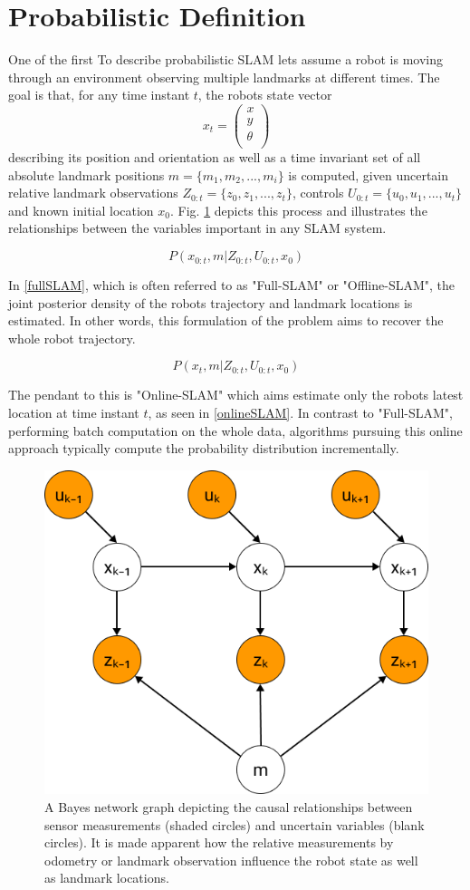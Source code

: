 \section{Probabilistic Definition}
One of the first 
To describe probabilistic SLAM lets assume a robot is moving through an environment observing multiple landmarks at different times. 
The goal is that, for any time instant $ t $, the robots state vector 
\[ x_{t} = 
\begin{pmatrix}
	x \\
	y \\
	\theta \\
\end{pmatrix}
\] describing its position and orientation as well as a time invariant set of all absolute landmark positions 
$ m = \{ m_{1}, m_{2}, ..., m_{i} \}$ 
is computed, given uncertain relative landmark observations $ Z_{0:t} = \{z_{0}, z_{1}, ..., z_{t}\}$, controls $ U_{0:t} = \{u_{0}, u_{1}, ..., u_{t}\}$ and known initial location $ x_{0} $. Fig. \ref{fig:slamGraphical} depicts this process and illustrates the relationships between the variables important in any SLAM system. 

\begin{equation}\label{fullSLAM}
	P(x_{0:t}, m | Z_{0:t}, U_{0:t}, x_{0})
\end{equation}

In \ref{fullSLAM}, which is often referred to as "Full-SLAM" or "Offline-SLAM", the joint posterior density of the robots trajectory and landmark locations is estimated. In other words, this formulation of the problem aims to recover the whole robot trajectory.

\begin{equation}\label{onlineSLAM}
	P(x_{t}, m | Z_{0:t}, U_{0:t}, x_{0})
\end{equation}

The pendant to this is "Online-SLAM" which aims estimate only the robots latest location at time instant $ t $, as seen in \ref{onlineSLAM}. In contrast to "Full-SLAM", performing batch computation on the whole data, algorithms pursuing this online approach typically compute the probability distribution incrementally. 

\begin{figure}
	\centering
	\includegraphics[width=0.4\linewidth]{img/SlamGraphical}
	\caption{
		A Bayes network graph depicting the causal relationships between sensor measurements (shaded circles) and uncertain variables (blank circles). It is made apparent how the relative measurements by odometry or landmark observation influence the robot state as well as landmark locations. 
	}
	\label{fig:slamGraphical}
\end{figure}

